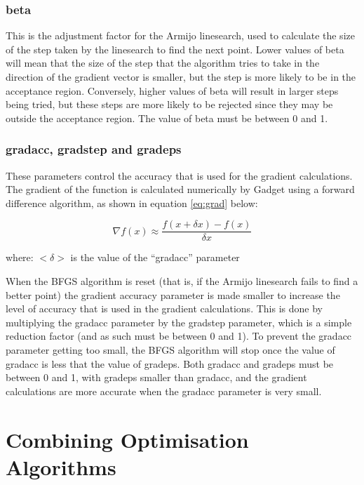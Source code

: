 \documentclass[]{book}
\begin{document}
\hypertarget{beta}{%
\subsubsection{beta}\label{beta}}

This is the adjustment factor for the Armijo linesearch, used to
calculate the size of the step taken by the linesearch to find the next
point. Lower values of beta will mean that the size of the step that the
algorithm tries to take in the direction of the gradient vector is
smaller, but the step is more likely to be in the acceptance region.
Conversely, higher values of beta will result in larger steps being
tried, but these steps are more likely to be rejected since they may be
outside the acceptance region. The value of beta must be between 0 and
1.

\hypertarget{gradacc-gradstep-and-gradeps}{%
\subsubsection{gradacc, gradstep and gradeps}\label{gradacc-gradstep-and-gradeps}}

These parameters control the accuracy that is used for the gradient
calculations. The gradient of the function is calculated numerically by
Gadget using a forward difference algorithm, as shown in
equation \eqref{eq:grad} below:

\begin{equation}
\label{eq:grad}
\nabla f(x) \approx \frac{f(x + \delta x) - f(x)} {\delta x}\end{equation}

where: \(<\delta>\) is the value of the ``gradacc'' parameter

When the BFGS algorithm is reset (that is, if the Armijo linesearch
fails to find a better point) the gradient accuracy parameter is made
smaller to increase the level of accuracy that is used in the gradient
calculations. This is done by multiplying the gradacc parameter by the
gradstep parameter, which is a simple reduction factor (and as such must
be between 0 and 1). To prevent the gradacc parameter getting too small,
the BFGS algorithm will stop once the value of gradacc is less that the
value of gradeps. Both gradacc and gradeps must be between 0 and 1, with
gradeps smaller than gradacc, and the gradient calculations are more
accurate when the gradacc parameter is very small.

\hypertarget{sec:combine}{%
\section{Combining Optimisation Algorithms}\label{sec:combine}}
\end{document}
